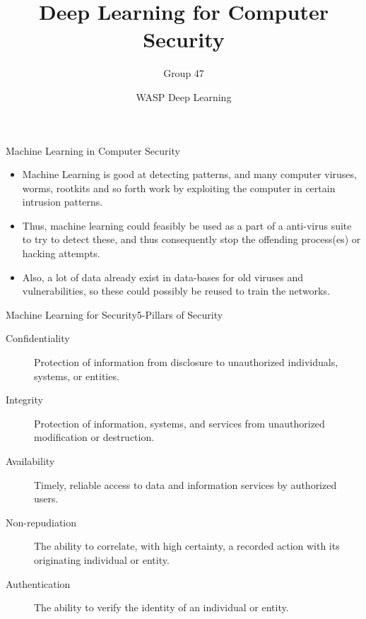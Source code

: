 \documentclass{beamer}
\title{Deep Learning for Computer Security}
\date{WASP Deep Learning}
\author[Agents 47]{Group 47}
\begin{document}
\begin{frame}
  \titlepage
\end{frame}

\begin{frame}{Machine Learning in Computer Security}

  \begin{itemize}

  \item Machine Learning is good at detecting patterns, and many computer
    viruses, worms, rootkits and so forth work by exploiting the computer in
    certain intrusion patterns.

  \item Thus, machine learning could feasibly be used as a part of a anti-virus
    suite to try to detect these, and thus consequently stop the offending
    process(es) or hacking attempts.

  \item Also, a lot of data already exist in data-bases for old viruses and
    vulnerabilities, so these could possibly be reused to train the networks.

  \end{itemize}

\end{frame}


\begin{frame}{Machine Learning for Security}{5-Pillars of Security}


  \begin{description}

  \item[Confidentiality] Protection of information from disclosure to
    unauthorized individuals, systems, or entities.

  \item[Integrity] Protection of information, systems, and services from
    unauthorized modification or destruction.

  \item[Availability] Timely, reliable access to data and information services
    by authorized users.

  \item[Non-repudiation] The ability to correlate, with high certainty, a
    recorded action with its originating individual or entity.

  \item[Authentication] The ability to verify the identity of an individual or
    entity.

  \end{description}

\end{frame}
\end{document}
